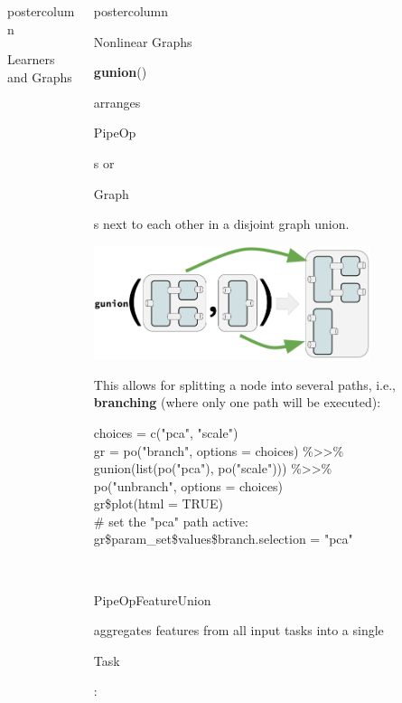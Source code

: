 \documentclass{beamer}
\newlength{\columnheight} %
\newcommand{\codeinline}[1]{\begin{codeboxinline}#1\end{codeboxinline}}
\begin{document}
\begin{frame}[fragile]{}
\begin{columns}
\begin{column}{.245\textwidth}
\begin{beamercolorbox}[center]{postercolumn}
\begin{minipage}{.98\textwidth}
{\begin{myblock}{Learners and Graphs}
            \end{myblock}
						\vfill}
				\end{minipage}
			\end{beamercolorbox}
		\end{column}
		\begin{column}{.245\textwidth}
			\begin{beamercolorbox}[center]{postercolumn}
				\begin{minipage}{.98\textwidth}
					\parbox[t][\columnheight]{\textwidth}{
            \begin{myblock}{Nonlinear Graphs}
              \codeinline{\textbf{gunion}()} arranges \codeinline{PipeOp}s or \codeinline{Graph}s next to each other in a disjoint graph union.
              \begin{center}
                \includegraphics[width=0.75\textwidth]{img/gunion.png}
              \end{center}
              This allows for splitting a node into several paths, i.e., \textbf{branching} (where only one path will be executed):
              \begin{codeboxexample}
						    {\footnotesize
                  choices = c("pca", "scale")\\
                  gr = po("branch", options = choices) \%>{}>\%\\
                  \hspace*{1ex} gunion(list(po("pca"), po("scale"))) \%>{}>\%\\
                  \hspace*{1ex} po("unbranch", options = choices)\\
                  gr\$plot(html = TRUE)\\
                  \# set the "pca" path active:\\
                  gr\$param\_set\$values\$branch.selection = "pca"}
					      \end{codeboxexample}
              \ \\
              \codeinline{PipeOpFeatureUnion} aggregates features from all input tasks into a single \codeinline{Task}:

\end{myblock}}
\end{minipage}
\end{beamercolorbox}
\end{column}
\end{columns}
\end{frame}
\end{document}
